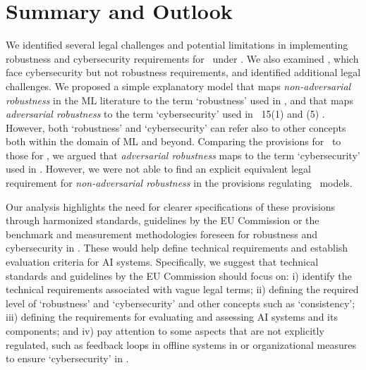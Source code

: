 
\section{Summary and Outlook}\label{sec:discussion_outlook}
% 
We identified several legal challenges and potential limitations in implementing robustness and cybersecurity requirements for \HRAIS\ under . 
%
We also examined \GPAIMSSR, which face cybersecurity but not robustness requirements, and identified additional legal challenges.
%
We proposed a simple explanatory model that maps \emph{non-adversarial robustness} in the ML literature to the term `robustness' used in , and that maps \emph{adversarial robustness} to the term `cybersecurity' used in \Art\ 15(1) and (5) \EUAIAct.
%
However, 
both `robustness' and `cybersecurity' can refer also to other concepts both within the domain of ML and beyond.
%
Comparing the provisions for \HRAIS\ to those for \GPAIMSSR, we argued that \emph{adversarial robustness} maps to the term `cybersecurity' used in . However, we were not able to find an explicit equivalent legal requirement for \emph{non-adversarial robustness} in the provisions regulating \GPAIMSSR\ models.

Our analysis highlights the need for clearer specifications of these provisions through harmonized standards, guidelines by the EU Commission or the benchmark and measurement methodologies foreseen for robustness and cybersecurity in . These would help define technical requirements and establish evaluation criteria for AI systems.
%
Specifically, we suggest that technical standards and guidelines by the EU Commission should focus on: i) identify the technical requirements associated with vague legal terms; ii) defining the required level of `robustness' and `cybersecurity' and other concepts such as `consistency'; iii) defining the requirements for evaluating and assessing AI systems and its components; and iv) pay attention to some aspects that are not explicitly regulated, such as feedback loops in offline systems in  or   organizational measures to ensure `cybersecurity' in .

